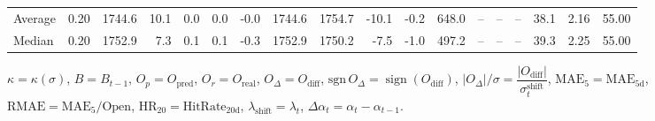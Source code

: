 \begin{threeparttable}
{\begin{tabular}{lrrrrrrrrrrrrrrrrr}
Average &     0.20 & 1744.6 &              10.1 &               0.0 &                0.0 &               -0.0 & 1744.6 & 1754.7 &      -10.1 &                     -0.2 &               648.0 &         -- &        -- &             -- &             38.1 &            2.16 &                  55.00 \\
 Median &     0.20 & 1752.9 &               7.3 &               0.1 &                0.1 &               -0.3 & 1752.9 & 1750.2 &       -7.5 &                     -1.0 &               497.2 &         -- &        -- &             -- &             39.3 &            2.25 &                  55.00 \\
\bottomrule
\end{tabular}
}
\begin{tablenotes}\footnotesize
\item $\kappa=\kappa(\sigma)$, $B=B_{t-1}$, $O_p=O_{\text{pred}}$, $O_r=O_{\text{real}}$, $O_\Delta=O_{\text{diff}}$, $\mathrm{sgn}\,O_\Delta=\operatorname{sign}(O_{\text{diff}})$, $|O_\Delta|/\sigma=\dfrac{|O_{\text{diff}}|}{\sigma_t^{\text{shift}}}$, $\mathrm{MAE}_5=\mathrm{MAE}_{5\text{d}}$, $\mathrm{RMAE}= \mathrm{MAE}_5 / \text{Open}$, $\mathrm{HR}_{20}=\mathrm{HitRate}_{20\text{d}}$, 
$\lambda_{\text{shift}}=\lambda_t$, 
$\Delta\alpha_t=\alpha_t-\alpha_{t-1}$.
\end{tablenotes}
\end{threeparttable}
\endgroup

